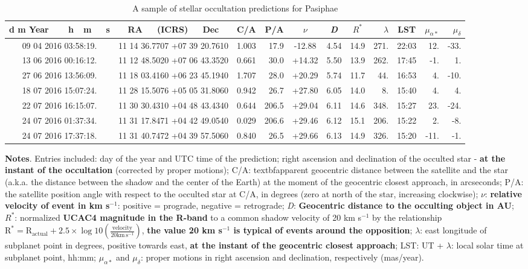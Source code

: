 \documentclass[useAMS,usenatbib]{mn2e}
\begin{document}
\begin{table}
\caption{\label{Tab: sample-cds} A sample of stellar occultation predictions for Pasiphae}
\begin{center}
\begin{tabular}{cccrcccrcrr}
\hline
\hline
d m Year~~~~h~~m~~~s & RA~~~(ICRS)~~~Dec & C/A & P/A & $\nu$ &{\it D} & $R^*$ & $\lambda$ & LST & $\mu_{\alpha*}$ & $\mu_{\delta}$ \tabularnewline
\hline
09 04 2016 03:58:19. & 11 14 36.7707 +07 39 20.7610 & 1.003 &  17.9 & -12.88 &  4.54 & 14.9 & 271. & 22:03 &  12. & -33. \tabularnewline 
13 06 2016 00:16:12. & 11 12 48.5020 +07 06 43.3520 & 0.661 &  30.0 & +14.32 &  5.50 & 13.9 & 262. & 17:45 &  -1. &   1. \tabularnewline 
27 06 2016 13:56:09. & 11 18 03.4160 +06 23 45.1940 & 1.707 &  28.0 & +20.29 &  5.74 & 11.7 &  44. & 16:53 &   4. & -10. \tabularnewline 
18 07 2016 15:07:24. & 11 28 15.5076 +05 05 31.8060 & 0.942 &  26.7 & +27.80 &  6.05 & 14.0 &   8. & 15:40 &   4. &   4. \tabularnewline 
22 07 2016 16:15:07. & 11 30 30.4310 +04 48 43.4340 & 0.644 & 206.5 & +29.04 &  6.11 & 14.6 & 348. & 15:27 &  23. & -24. \tabularnewline 
24 07 2016 01:37:34. & 11 31 17.8471 +04 42 49.0540 & 0.029 & 206.6 & +29.46 &  6.12 & 15.1 & 206. & 15:22 &   2. &  -8. \tabularnewline 
24 07 2016 17:37:18. & 11 31 40.7472 +04 39 57.5060 & 0.840 &  26.5 & +29.66 &  6.13 & 14.9 & 326. & 15:20 & -11. &  -1. \tabularnewline 
\hline
\end{tabular}
\end{center}
\begin{flushleft}
\textbf{Notes}. Entries included: day of the year and UTC time of the prediction; right ascension and declination of the occulted star - \textbf{at the instant of the occultation} (corrected by proper motions); C/A: textbf{apparent geocentric distance between the satellite and the star (a.k.a. the distance between the shadow and the center of the Earth) at the moment of the geocentric closest approach}, in arcseconds; P/A: the satellite position angle with respect to the occulted star at C/A, in degrees (zero at north of the star, increasing clockwise); $\nu$: \textbf{relative velocity of event in km s$^{-1}$}: positive = prograde, negative = retrograde; {\it D}: \textbf{Geocentric distance to the occulting object in AU}; $R^*$: normalized \textbf{UCAC4 magnitude in the R-band} to a common shadow velocity of 20 km s$^{-1}$ by the relationship $\textrm{R}^* = \textrm{R}_{\textrm{actual}} + 2.5 \times \log 10 \left(\frac{\textrm{velocity}} {20 \textrm{km}\, \textrm{s}^{-1}} \right)$, \textbf{the value 20 km s$^{-1}$ is typical of events around the opposition}; $\lambda$: east longitude of subplanet point in degrees, positive towards east, \textbf{at the instant of the geocentric closest approach}; LST: UT + $\lambda$: local solar time at subplanet point, hh:mm; $\mu_{\alpha *}$ and $\mu_{\delta}$: proper motions in right ascension and declination, respectively (mas/year).
\end{flushleft}
\end{table}
\end{document}
